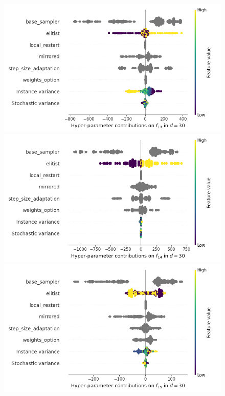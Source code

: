 \begin{figure}[t]
	\includegraphics[height=0.15\textheight,trim=0mm 0mm 30mm 0mm,clip]{images/img_summary_f13_d30.png}
	\includegraphics[height=0.15\textheight,trim=60mm 0mm 30mm 0mm,clip]{images/img_summary_f14_d30.png}
	\includegraphics[height=0.15\textheight,trim=60mm 0mm 30mm 0mm,clip]{images/img_summary_f15_d30.png}

\end{figure}
